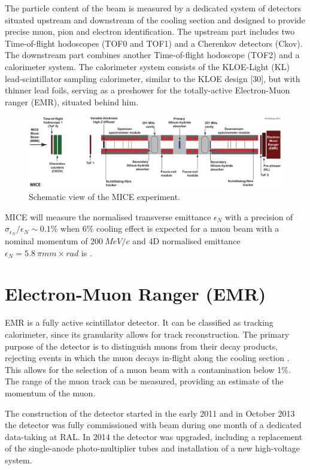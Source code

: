 \documentclass[a4paper,11pt]{article}
\begin{document}
The particle content of the beam is measured by a dedicated system of detectors situated upstream and downstream of the
cooling section and designed to provide precise muon, pion and electron identification. The upstream part includes two
Time-of-flight hodoscopes (TOF0 and TOF1) and a Cherenkov detectors (Ckov). The downstream part combines another 
Time-of-flight hodoscope (TOF2) and a calorimeter system. The calorimeter system consists of the KLOE-Light (KL)
lead-scintillator sampling calorimeter, similar to the KLOE design [30], but with thinner lead foils, serving
as a preshower for the totally-active Electron-Muon ranger (EMR), situated behind him.

\begin{figure}[h]
 \includegraphics[width=.95\textwidth]{./Cooling-demo.pdf}
 \caption{Schematic view of the MICE experiment.}
 \label{mice}
\end{figure}

MICE will measure the normalised transverse emittance $\epsilon_N$ with a precision of 
$\sigma_{\epsilon_N}/\epsilon_N \sim 0.1 \%$ when $6\%$ cooling effect is  expected for a muon beam with a nominal momentum
of $200 \ MeV/c$ and 4D normalised emittance $\epsilon_N = 5.8 \ \pi mm \times rad$ is .

\section{Electron-Muon Ranger (EMR)}
EMR is a fully active scintillator detector. It can be classified as tracking calorimeter, since its granularity allows for track reconstruction.
The primary purpose of the detector is to distinguish muons from their decay products, rejecting events in which the muon decays in-flight along
the cooling section \cite{ruslan}.  This allows for the selection of a muon beam with a contamination below 1\%.
The range of the muon track can be measured, providing an estimate of the momentum of the muon. 

The construction of the detector started in the early 2011 and in October 2013 the detector was fully commissioned with beam
during one month of a dedicated data-taking at RAL. In 2014 the detector was upgraded, including a replacement of the single-anode
photo-multiplier tubes and installation of a new high-voltage system.
\end{document}
